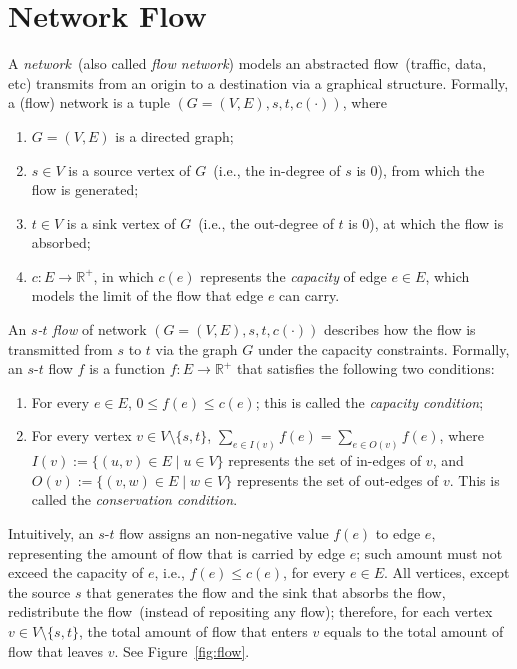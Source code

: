 \documentclass[letterpaper,11pt]{article}
\theoremstyle{mytheorem}
\begin{document}
\section*{Network Flow}

A \emph{network}~(also called \emph{flow network}) models 
an abstracted flow~(traffic, data, etc) transmits from an origin to a destination
via a graphical structure. Formally, a (flow) network is a tuple $(G = (V, E), s, t, c(\cdot))$, where

\vspace*{-\topsep}
\begin{enumerate}
\item $G = (V, E)$ is a directed graph;
\item $s\in V$ is a source vertex of $G$~(i.e., the in-degree of $s$ is 0), from which the flow is generated;
\item $t\in V$ is a sink vertex of $G$~(i.e., the out-degree of $t$ is 0), at which the flow is absorbed;
\item $c: E\to \mathbb{R}^+$, in which $c(e)$ represents the \emph{capacity} of edge $e\in E$, which models the limit of the flow that edge $e$ can carry.
\end{enumerate}

An \emph{$s$-$t$ flow} of network $(G = (V, E), s, t, c(\cdot))$
describes {how} the flow is transmitted from $s$ to $t$
via the graph $G$ under the capacity constraints. Formally,
an $s$-$t$ flow $f$ is a function $f: E\to \mathbb{R}^+$
that satisfies the following two conditions:
\vspace*{-\topsep}
\begin{enumerate}
\item For every $e\in E$, $0\le f(e) \le c(e)$; this is called the \emph{capacity condition};
\item For every vertex $v\in V\setminus\{s,t\}$, $\sum_{e\in I(v)} f(e) = \sum_{e\in O(v)} f(e)$, where $I(v) := \{(u,v)\in E\mid u\in V\}$ represents
the set of in-edges of $v$, and $O(v) := \{(v,w)\in E\mid w\in V\}$ represents
the set of out-edges of $v$. This is called the \emph{conservation condition}.
\end{enumerate}

Intuitively, an $s$-$t$ flow assigns an non-negative value $f(e)$ to edge $e$, representing the
amount of flow that is carried by edge $e$; such amount must not exceed the capacity of $e$, i.e., $f(e) \le c(e)$, for every $e\in E$.
All vertices, except the source $s$ that generates the flow and the sink that absorbs the flow,
redistribute the flow~(instead of repositing any flow); therefore, for each vertex $v\in V\setminus\{s,t\}$,
the total amount of flow that enters $v$ equals to the total amount of flow that leaves $v$.
See Figure~\ref{fig:flow}.
\end{document}
